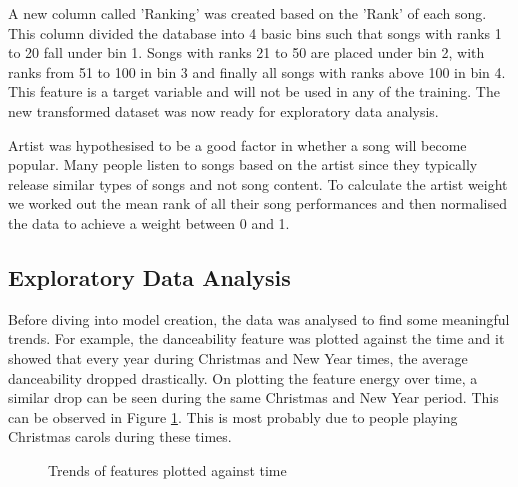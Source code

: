 \documentclass{article}
\begin{document}
A new column called 'Ranking' was created based on the 'Rank' of each song. This column divided the database into 4 basic bins such that songs with ranks 1 to 20 fall under bin 1. Songs with ranks 21 to 50 are placed under bin 2, with ranks from 51 to 100 in bin 3 and finally all songs with ranks above 100 in bin 4. This feature is a target variable and will not be used in any of the training. The new transformed dataset was now ready for exploratory data analysis. 

Artist was hypothesised to be a good factor in whether a song will become popular. Many people listen to songs based on the artist since they typically release similar types of songs and not song content. To calculate the artist weight we worked out the mean rank of all their song performances and then normalised the data to achieve a weight between 0 and 1.

\subsection{Exploratory Data Analysis}


Before diving into model creation, the data was analysed to find some meaningful trends. For example, the danceability feature was plotted against the time and it showed that every year during Christmas and New Year times, the average danceability dropped drastically. On plotting the feature energy over time, a similar drop can be seen during the same Christmas and New Year period. This can be observed in Figure \ref{fig:example}. This is most probably due to people playing Christmas carols during these times. 

\begin{figure}%
    \centering
    \qquad
    \caption{Trends of features plotted against time}%
    \label{fig:example}%
\end{figure}
\end{document}
